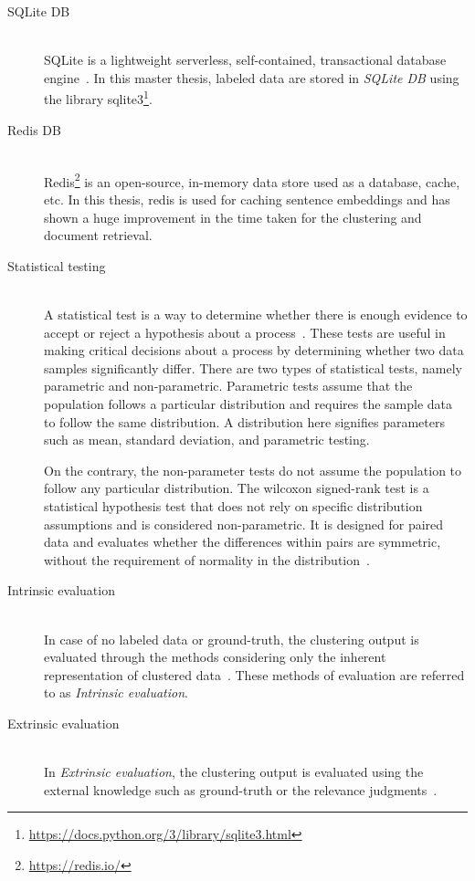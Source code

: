 \begin{description}
	
	\item[SQLite DB] \hfill \\ SQLite is a lightweight serverless, self-contained, transactional database engine~\cite{bhosale2015sqlite}. In this master thesis, labeled data are stored in \textit{SQLite DB} using the library sqlite3\footnote{\url{https://docs.python.org/3/library/sqlite3.html}}.
	
	\item[Redis DB] \hfill \\  Redis\footnote{\url{https://redis.io/}} is an open-source, in-memory data store used as a database, cache, etc. In this thesis, redis is used for caching sentence embeddings and has shown a huge improvement in the time taken for the clustering and document retrieval.
	
	
	\item[Statistical testing] \hfill \\ A statistical test is a way to determine whether there is enough evidence
	to accept or reject a hypothesis about a process~\cite{kaur2015comparative}. These tests are useful in
	making critical decisions about a process by determining whether two data samples significantly
	differ. There are two types of statistical tests, namely parametric
	and non-parametric. Parametric tests assume that the population follows a particular distribution and requires the sample data to follow the same distribution. A distribution
	here signifies parameters such as mean, standard deviation, and parametric
	testing. 
	
	On the contrary, the non-parameter tests do not assume the population to follow
	any particular distribution. The wilcoxon signed-rank test is a statistical hypothesis test that does not rely on specific distribution assumptions and is considered non-parametric. It is designed for paired data and evaluates whether the differences within pairs are symmetric, without the requirement of normality in the distribution~\cite{oyeka2012modified}.
	
	\item[Intrinsic evaluation] \hfill \\ In case of no labeled data or ground-truth, the clustering output is evaluated through the methods considering only the inherent representation of clustered data~\cite{de2012document}. These methods of evaluation are referred to as \textit{Intrinsic evaluation}. 
	
	\item[Extrinsic evaluation] \hfill \\ In \textit{Extrinsic evaluation}, the clustering output is evaluated using the external knowledge such as ground-truth or the relevance judgments~\cite{de2012document}. 
	

\end{description}
